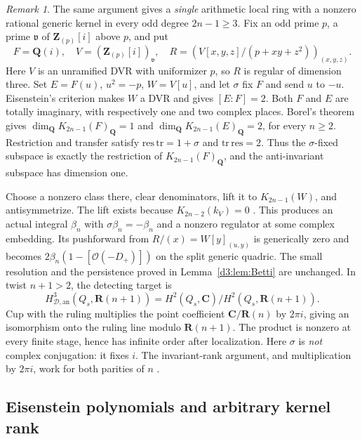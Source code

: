 \documentclass[11pt,a4paper]{amsart}
\numberwithin{equation}{section}
\theoremstyle{definition}
\theoremstyle{remark}
\newtheorem{remark}[theorem]{Remark}
\newcommand{\Q}{\mathbf Q}
\newcommand{\Z}{\mathbf Z}
\newcommand{\R}{\mathbf R}
\newcommand{\C}{\mathbf C}
\newcommand{\OO}{\mathcal O}
\newcommand{\HD}{H_{\mathcal D,\mathrm{an}}}
\begin{document}
\begin{remark}
\label{d3:rem:fixedgaussianallodd}
The same argument gives a \emph{single} arithmetic local
ring with a nonzero rational generic kernel in every odd degree
\(2n-1\ge3\). Fix an odd prime \(p\), a prime \(\mathfrak v\)
of \(\Z_{(p)}[i]\) above \(p\), and put
\[
 F=\Q(i),\quad V=(\Z_{(p)}[i])_{\mathfrak v},\quad
 R=\left(V[x,y,z]/(p+xy+z^2)\right)_{(x,y,z)}.
\]
Here \(V\) is an unramified DVR with uniformizer \(p\), so \(R\)
is regular of dimension three. Set \(E=F(u)\), \(u^2=-p\),
\(W=V[u]\), and let \(\sigma\) fix \(F\) and send \(u\) to \(-u\).
Eisenstein's criterion makes \(W\) a DVR and gives \([E:F]=2\).
Both \(F\) and \(E\) are totally imaginary, with respectively
one and two complex places. Borel's theorem \cite[Proposition~12.2]{Borel} gives
\(\dim_{\Q}K_{2n-1}(F)_{\Q}=1\) and
\(\dim_{\Q}K_{2n-1}(E)_{\Q}=2\), for every \(n\ge2\).
Restriction and transfer satisfy
\(\mathrm{res}\,\mathrm{tr}=1+\sigma\) and
\(\mathrm{tr}\,\mathrm{res}=2\).
Thus the \(\sigma\)-fixed subspace is exactly the restriction
of \(K_{2n-1}(F)_{\Q}\), and the anti-invariant subspace has
dimension one.

Choose a nonzero class there, clear denominators, lift it to
\(K_{2n-1}(W)\), and antisymmetrize. The lift exists because
\(K_{2n-2}(k_V)=0\)
\cite[Chapter~IV, Corollary~1.13]{Weibel}. This produces an actual integral
\(\beta_n\) with \(\sigma\beta_n=-\beta_n\) and a nonzero
regulator at some complex embedding. Its pushforward from
\(R/(x)=W[y]_{(u,y)}\) is generically zero and becomes
\(2\beta_n(1-[\OO(-D_+)])\) on the split generic quadric.
The small resolution and the persistence proved in
Lemma~\ref{d3:lem:Betti} are unchanged. In twist \(n+1>2\), the detecting target is
\[
 \HD^3(Q_s,\R(n+1))
   =H^2(Q_s,\C)/H^2(Q_s,\R(n+1)).
\]
Cup with the ruling multiplies the point coefficient
\(\C/\R(n)\) by \(2\pi i\), giving an isomorphism onto the
ruling line modulo \(\R(n+1)\). The product is nonzero at
every finite stage, hence has infinite order after localization.
Here \(\sigma\) is \emph{not} complex conjugation: it fixes \(i\).
The invariant-rank argument, and multiplication by \(2\pi i\),
work for both parities of \(n\) \cite{Borel,BunkeTamme,Quillen}.
\end{remark}


\subsection{Eisenstein polynomials and arbitrary kernel rank}\label{d3:sec:eisenstein}
\end{document}
